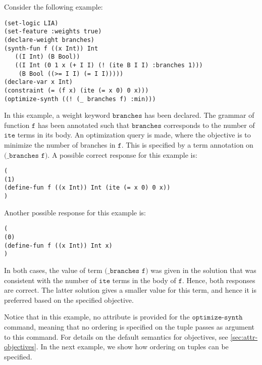 \documentclass[english,a4paper,10pt]{article}
\begin{document}
\begin{example}
Consider the following example:
\begin{lstlisting}[language=SyGuS]
(set-logic LIA)
(set-feature :weights true)
(declare-weight branches)
(synth-fun f ((x Int)) Int
   ((I Int) (B Bool))
   ((I Int (0 1 x (+ I I) (! (ite B I I) :branches 1)))
    (B Bool ((>= I I) (= I I)))))
(declare-var x Int)
(constraint (= (f x) (ite (= x 0) 0 x)))
(optimize-synth ((! (_ branches f) :min)))
\end{lstlisting}
In this example, a weight keyword $\texttt{branches}$ has been declared.
The grammar of function $\texttt{f}$ has been annotated such that
$\texttt{branches}$ corresponds to the number of $\texttt{ite}$ terms in its body.
An optimization query is made, where
the objective is to minimize the number of branches in $\texttt{f}$.
This is specified by a term annotation on $\texttt{(\_ branches f)}$.
A possible correct response for this example is:
\begin{lstlisting}[language=SyGuS]
(
(1)
(define-fun f ((x Int)) Int (ite (= x 0) 0 x))
)
\end{lstlisting}
Another possible response for this example is:
\begin{lstlisting}[language=SyGuS]
(
(0)
(define-fun f ((x Int)) Int x)
)
\end{lstlisting}
In both cases, the value of term $\texttt{(\_ branches f)}$ was given
in the solution that was consistent with the number of
$\texttt{ite}$ terms in the body of $\texttt{f}$.
Hence, both responses are correct.
The latter solution gives a smaller value for this term,
and hence it is preferred based on the specified objective.

Notice that in this example,
no attribute is provided for the $\texttt{optimize-synth}$ command,
meaning that no ordering is specified on the tuple passes as argument
to this command.
For details on the default semantics for objectives, see \cref{sec:attr-objectives}.
In the next example, we show how ordering on tuples can be specified.
\end{example}
\end{document}
